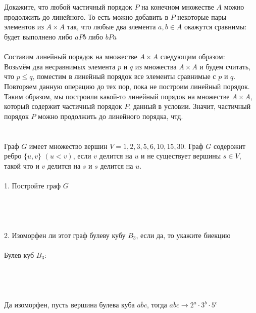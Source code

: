 \documentclass{article}
\begin{document}
\section{}
Докажите, что любой частичный порядок $P$ на конечном множестве $A$ можно продолжить до линейного. То есть можно добавить в $P$ некоторые пары элементов из $A\times A$ так, что любые два элемента $a,b\in A$ окажутся сравнимы: будет выполнено либо $aPb$ либо $bPa$\\\\
Составим линейный порядок на множестве $A\times A$ следующим образом:\\
Возьмём два несравнимых элемента $p$ и $q$ из множества $A\times A$ и будем считать, что $p\leq q$, поместим в линейный порядок все элементы сравнимые с $p$ и $q$. Повторяем данную операцию до тех пор, пока не построим линейный порядок. Таким образом, мы построили какой-то линейный порядок на множестве $A\times A$, который содержит частичный порядок $P$, данный в условии. Значит, частичный порядок $P$ можно продолжить до линейного порядка, чтд. 
\section{}
Граф $G$ имеет множество вершин $V={1,2,3,5,6,10,15,30}$. Граф $G$ содерожит ребро $\{u,v\}$ $(u<v)$, если $v$ делится на $u$ и не существует вершины $s\in V$, такой что и $v$ делится на $s$ и $s$ делится на $u$.\\\\
1. Постройте граф $G$\\\\
\\\\\\
2. Изоморфен ли этот граф булеву кубу $B_3$, если да, то укажите биекцию\\\\
Булев куб $B_3$:\\\\
\\\\\\
Да изоморфен, пусть вершина булева куба $\overline{abc}$, тогда $\overline{abc}\rightarrow2^{a}\cdot3^{b}\cdot5^{c}$
\end{document}
